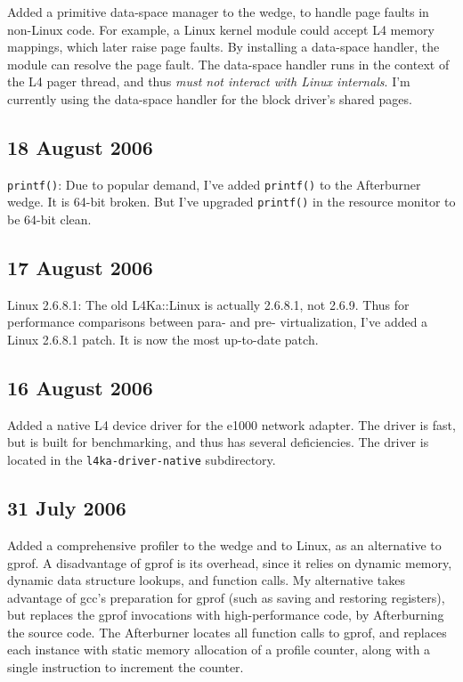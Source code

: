 \documentclass[10pt,a4paper]{article}
\newcommand{\code}[1]{\texttt{#1}}
\newcommand{\dir}[1]{\texttt{#1}}
\begin{document}
Added a primitive data-space manager to the wedge, to handle page
faults in non-Linux code.  For example, a Linux kernel module could
accept L4 memory mappings, which later raise page faults.  By installing a
data-space handler, the module can resolve the page fault.  The
data-space handler runs in the context of the L4 pager thread, and
thus \emph{must not interact with Linux internals}.  I'm currently
using the data-space handler for the block driver's shared pages.

\subsection*{18 August 2006}

\code{printf()}: Due to popular demand, I've added \code{printf()}
to the Afterburner wedge.  It is 64-bit broken.  But I've upgraded
\code{printf()} in the resource monitor to be 64-bit clean.

\subsection*{17 August 2006}

Linux 2.6.8.1: The old L4Ka::Linux is actually 2.6.8.1, not
2.6.9.  Thus for performance comparisons between para- and pre-
virtualization, I've added a Linux 2.6.8.1 patch.  It is now the most
up-to-date patch.

\subsection*{16 August 2006}

Added a native L4 device driver for the e1000 network adapter.  The
driver is fast, but is built for benchmarking, and thus has several
deficiencies.  The driver is located in the \dir{l4ka-driver-native}
subdirectory.

\subsection*{31 July 2006}

Added a comprehensive profiler to the wedge and to Linux, as an
alternative to gprof.  A disadvantage of gprof is its overhead, since
it relies on dynamic memory, dynamic data structure lookups, and
function calls.  My alternative takes advantage of gcc's preparation
for gprof (such as saving and restoring registers), but replaces the
gprof invocations with high-performance code, by Afterburning the
source code.  The Afterburner locates all function calls to gprof, and
replaces each instance with static memory allocation of a profile counter,
along with a single instruction to increment the counter.
\end{document}
